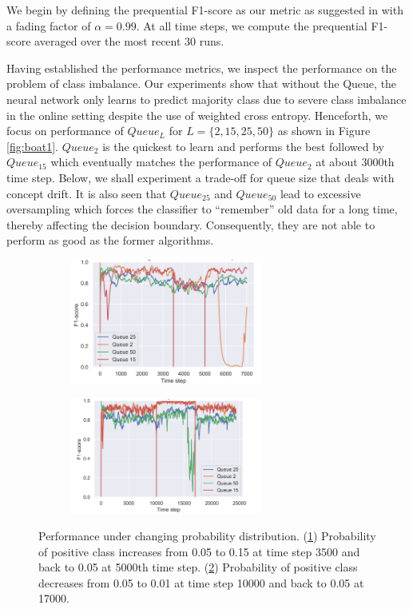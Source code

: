 \documentclass{article}
\begin{document}
  We begin by defining the prequential F1-score as our metric as suggested in \cite{Gama2012OnES}
  with a fading factor of \(\alpha=0.99\). At all time steps, we compute the prequential F1-score averaged over the most recent
  \(30\) runs.

  Having established the performance metrics, we inspect the performance on the problem of class imbalance. Our
  experiments show that without the Queue, the neural network only learns to predict majority class due to severe class imbalance in the online setting despite the use
  of weighted cross entropy. Henceforth, we focus on performance of \(Queue_L\) for \(L=\{2, 15, 25, 50\}\)  as shown in Figure \ref{fig:boat1}.
  \(Queue_2\) is the quickest to learn and performs the best
  followed by \(Queue_{15}\) which eventually matches the performance
  of \(Queue_2\) at about 3000th time step. Below, we shall experiment a trade-off for queue size that deals with concept drift. It is also seen that
  \(Queue_{25}\) and \(Queue_{50}\) lead to excessive oversampling which forces the classifier to ``remember'' old data for a long time, thereby affecting
  the decision boundary. Consequently, they are not able to perform as good as the former algorithms.

  \begin{figure}
    \centering
    \begin{subfigure}{.5\textwidth}
      \centering
      \includegraphics[width=2.5in]{concept_drift_more.png}
      \subcaption{}
      \label{fig:sub1}
    \end{subfigure}%
    \begin{subfigure}{.5\textwidth}
      \centering
      \includegraphics[width=2.5in]{concept_drift.png}
      \vspace{0.01pt}
      \subcaption{}
      \label{fig:sub2}
    \end{subfigure}
    \caption{Performance under changing probability distribution. (\ref{fig:sub1}) Probability of positive class increases from 0.05 to 0.15 at time step 3500 and
    back to 0.05 at 5000th time step. (\ref{fig:sub2}) Probability of positive class decreases from 0.05 to 0.01 at time step 10000 and
    back to 0.05 at 17000.}
    \label{fig:test}
  \end{figure}
\end{document}
